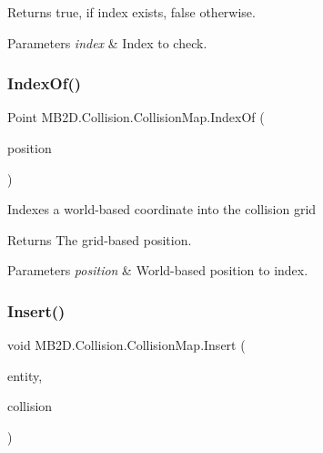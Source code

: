 \begin{DoxyReturn}{Returns}
{\ttfamily true}, if index exists, {\ttfamily false} otherwise.
\end{DoxyReturn}

\begin{DoxyParams}{Parameters}
{\em index} & Index to check.\\
\hline
\end{DoxyParams}
\hypertarget{class_m_b2_d_1_1_collision_1_1_collision_map_a738f7b15771993a037044aace6a6e09b}{}\label{class_m_b2_d_1_1_collision_1_1_collision_map_a738f7b15771993a037044aace6a6e09b} 
\subsubsection{\texorpdfstring{Index\+Of()}{IndexOf()}}
{\footnotesize\ttfamily Point M\+B2\+D.\+Collision.\+Collision\+Map.\+Index\+Of (\begin{DoxyParamCaption}\item[{Point}]{position }\end{DoxyParamCaption})\hspace{0.3cm}{\ttfamily [inline]}}



Indexes a world-\/based coordinate into the collision grid 

\begin{DoxyReturn}{Returns}
The grid-\/based position.
\end{DoxyReturn}

\begin{DoxyParams}{Parameters}
{\em position} & World-\/based position to index.\\
\hline
\end{DoxyParams}
\hypertarget{class_m_b2_d_1_1_collision_1_1_collision_map_a7d53571c049d50d62e6132413fe712e3}{}\label{class_m_b2_d_1_1_collision_1_1_collision_map_a7d53571c049d50d62e6132413fe712e3} 
\subsubsection{\texorpdfstring{Insert()}{Insert()}}
{\footnotesize\ttfamily void M\+B2\+D.\+Collision.\+Collision\+Map.\+Insert (\begin{DoxyParamCaption}\item[{\hyperlink{class_m_b2_d_1_1_entity_component_1_1_entity}{Entity}}]{entity,  }\item[{\hyperlink{class_m_b2_d_1_1_entity_component_1_1_collision_component}{Collision\+Component}}]{collision }\end{DoxyParamCaption})\hspace{0.3cm}{\ttfamily [inline]}}



